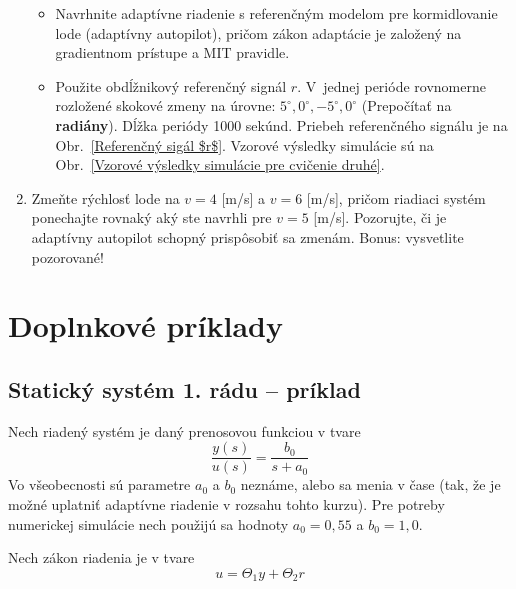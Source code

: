 \documentclass[a4paper, 10pt, ]{article}
\begin{document}
\begin{enumerate}[leftmargin=0pt, labelsep=4mm, itemsep=0pt]
	\begin{itemize}[leftmargin=0pt, labelsep=4mm, itemsep=0pt]
		\item Navrhnite adaptívne riadenie s referenčným modelom pre kormidlovanie lode (adaptívny autopilot), pričom zákon adaptácie je založený na gradientnom prístupe a MIT pravidle.

		\item Použite obdĺžnikový referenčný signál $r$. V~jednej perióde rovnomerne rozložené skokové zmeny na úrovne: $5^\circ,0^\circ,-5^\circ,0^\circ$ (Prepočítať na \textbf{radiány}). Dĺžka periódy 1000 sekúnd. Priebeh referenčného signálu je na Obr.~\ref{Referenčný sigál $r$}. Vzorové výsledky simulácie sú na Obr.~\ref{Vzorové výsledky simulácie pre cvičenie druhé}.
	\end{itemize}


	\item Zmeňte rýchlosť lode na $v=4$ [m/s] a $v=6$ [m/s], pričom riadiaci systém ponechajte rovnaký aký ste navrhli pre $v=5$ [m/s]. Pozorujte, či je adaptívny autopilot schopný prispôsobiť sa zmenám. Bonus: vysvetlite pozorované!

\end{enumerate}












\section{Doplnkové príklady}


\subsection{Statický systém 1. rádu -- príklad}

Nech riadený systém je daný prenosovou funkciou v tvare
\begin{equation}
    \frac{y(s)}{u(s)} = \frac{b_0}{s+a_0}
\end{equation}
Vo všeobecnosti sú parametre $a_0$ a $b_0$ neznáme, alebo sa menia v čase (tak, že je možné uplatniť adaptívne riadenie v rozsahu tohto kurzu). Pre potreby numerickej simulácie nech použijú sa hodnoty $a_0 = 0,55$ a $b_0 = 1,0$.

Nech zákon riadenia je v tvare
\begin{equation}
    u = \Theta_1 y + \Theta_2 r
\end{equation}
\end{document}
